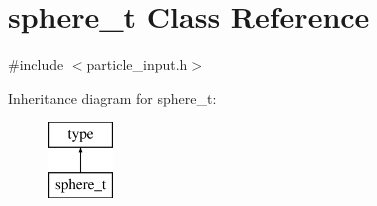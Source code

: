 \hypertarget{classsphere__t}{}\section{sphere\+\_\+t Class Reference}
\label{classsphere__t}


{\ttfamily \#include $<$particle\+\_\+input.\+h$>$}

Inheritance diagram for sphere\+\_\+t\+:\begin{figure}[H]
\begin{center}
\leavevmode
\includegraphics[height=2.000000cm]{classsphere__t}
\end{center}
\end{figure}
